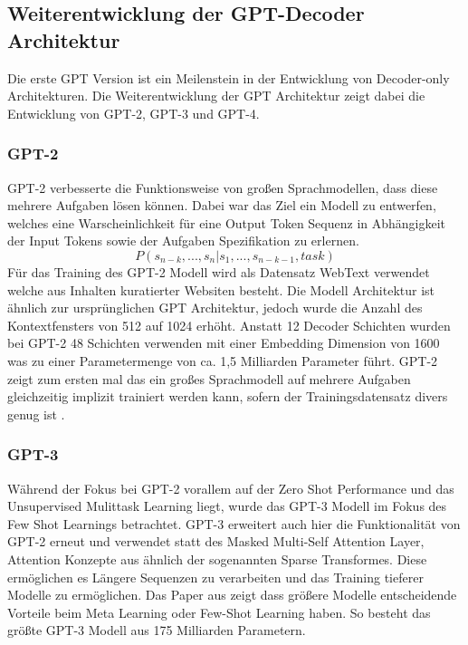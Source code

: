 \documentclass[conference]{IEEEtran}
\begin{document}
\subsection{Weiterentwicklung der GPT-Decoder Architektur}
Die erste GPT Version ist ein Meilenstein in der Entwicklung von Decoder-only Architekturen. Die Weiterentwicklung der GPT Architektur zeigt dabei die Entwicklung von GPT-2, GPT-3 und GPT-4. 
\subsubsection{GPT-2}
GPT-2 verbesserte die Funktionsweise von großen Sprachmodellen, dass diese mehrere Aufgaben lösen können. Dabei war das Ziel ein Modell zu entwerfen, welches eine Warscheinlichkeit für eine Output Token Sequenz in Abhängigkeit der Input Tokens sowie der Aufgaben Spezifikation zu erlernen.
\begin{equation}
    P(s_{n-k}, ..., s_n|s_1, ..., s_{n-k-1},task)
    \label{eq:Wahrscheinlichkeit}
\end{equation}
Für das Training des GPT-2 Modell wird als Datensatz WebText verwendet welche aus Inhalten kuratierter Websiten besteht. Die Modell Architektur ist ähnlich zur ursprünglichen GPT Architektur, jedoch wurde die Anzahl des Kontextfensters von 512 auf 1024 erhöht. Anstatt 12 Decoder Schichten wurden bei GPT-2 48 Schichten verwenden mit einer Embedding Dimension von 1600 was zu einer Parametermenge von ca. 1,5 Milliarden Parameter führt. GPT-2 zeigt zum ersten mal das ein großes Sprachmodell auf mehrere Aufgaben gleichzeitig implizit trainiert werden kann, sofern der Trainingsdatensatz divers genug ist \cite{radfordLanguageModelsAre}. 
\subsubsection{GPT-3}
Während der Fokus bei GPT-2 vorallem auf der Zero Shot Performance und das Unsupervised Mulittask Learning liegt, wurde das GPT-3 Modell im Fokus des Few Shot Learnings betrachtet. GPT-3 erweitert auch hier die Funktionalität von GPT-2 erneut und verwendet statt des Masked Multi-Self Attention Layer, Attention Konzepte aus \cite{childGeneratingLongSequences2019} ähnlich der sogenannten Sparse Transformes. Diese ermöglichen es Längere Sequenzen zu verarbeiten und das Training tieferer Modelle zu ermöglichen. Das Paper aus \cite{brownLanguageModelsAre2020} zeigt dass größere Modelle entscheidende Vorteile beim Meta Learning oder Few-Shot Learning haben. So besteht das größte GPT-3 Modell aus 175 Milliarden Parametern. 
\end{document}
